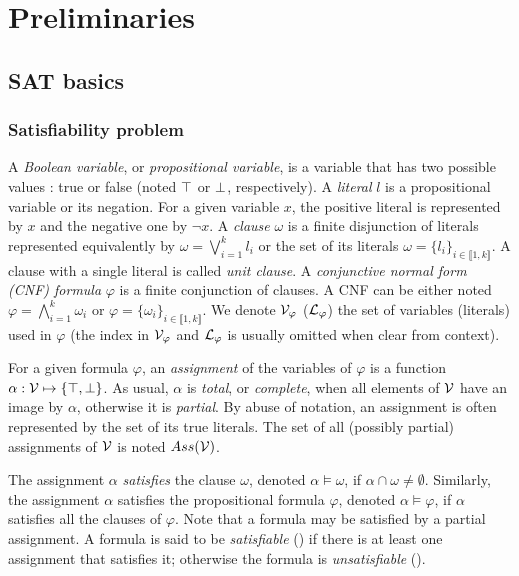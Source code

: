 \chapter{Preliminaries}\label{chap:preliminaries}

\section{SAT basics}

\subsection{Satisfiability problem}
A \emph{Boolean variable}, or \emph{propositional variable}, is a variable that
has two possible values : true or false (noted $\top$ or $\bot$,
respectively).  A \emph{literal} $l$ is a propositional variable or its
negation. For a given variable $x$, the positive literal is represented by $x$
and the negative one by $\neg x$.
A \emph{clause} $\omega$ is a finite disjunction of literals represented
equivalently by $\omega = \bigvee_{i=1}^k l_i$ or the set of its literals
$\omega = \{l_i\}_{i \in \llbracket 1,k \rrbracket}$. A clause with a single
literal is called \emph{unit clause}.
A \emph{conjunctive normal form (CNF) formula} $\varphi$ is a finite
conjunction of clauses.  A CNF can be either noted $\varphi = \bigwedge_{i=1}^k
\omega_i$ or $\varphi = \{\omega_i\}_{i \in \llbracket 1,k \rrbracket}$. We
denote $\mathcal{V}_\varphi$ ($\mathcal{L}_\varphi$) the set of variables (literals) used in
$\varphi$ (the index in $\mathcal{V}_\varphi$ and $\mathcal{L}_\varphi$ is usually omitted when
clear from context).

For a given formula $\varphi$, an \emph{assignment} of the variables of
$\varphi$ is a function $\alpha: \mathcal{V} \mapsto \{ \top, \bot \}$.  As usual, $\alpha$ is
\emph{total}, or \emph{complete}, when all elements of $\mathcal{V}$ have an image by
$\alpha$, otherwise it is \emph{partial}. By abuse of notation, an assignment is
often represented by the set of its true literals.  The set of all (possibly
partial) assignments of $\mathcal{V}$ is noted $Ass(\mathcal{V})$.

The assignment $\alpha$ \emph{satisfies} the clause $\omega$, denoted $\alpha
\models \omega$, if $\alpha \cap \omega \neq \emptyset$. Similarly, the assignment
$\alpha$ satisfies the propositional formula $\varphi$, denoted $\alpha \models
\varphi$, if $\alpha$ satisfies all the clauses of $\varphi$. Note that a
formula may be satisfied by a partial assignment. A formula is said to be
\emph{satisfiable} (\sat) if there is at least one assignment that satisfies it;
otherwise the formula is \emph{unsatisfiable} (\unsat).


